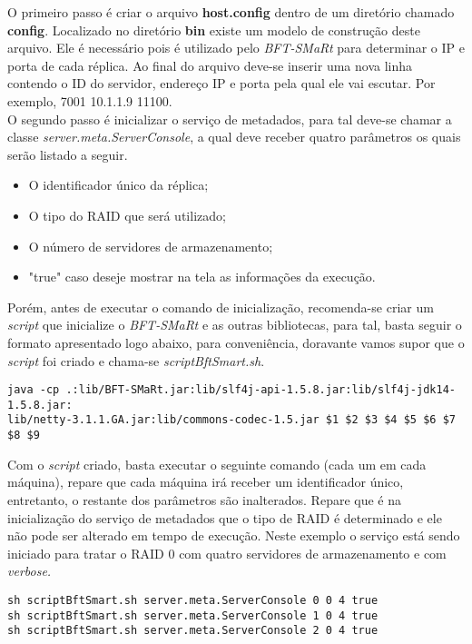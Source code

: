 O primeiro passo é criar o arquivo \textbf{host.config} dentro de um diretório chamado \textbf{config}. Localizado no diretório \textbf{bin} existe um modelo de construção deste arquivo. Ele é necessário pois é utilizado pelo \textit{BFT-SMaRt} para determinar o IP e porta de cada réplica. Ao final do arquivo deve-se inserir uma nova linha contendo o ID do servidor, endereço IP e porta pela qual ele vai escutar. Por exemplo, 7001 10.1.1.9 11100.
\\

O segundo passo é inicializar o serviço de metadados, para tal deve-se chamar a classe \textit{server.meta.ServerConsole}, a qual deve receber quatro parâmetros os quais serão listado a seguir. 

\begin{itemize}
	\item O identificador único da réplica;
	\item O tipo do RAID que será utilizado;
	\item O número de servidores de armazenamento;
	\item "true" caso deseje mostrar na tela as informações da execução.
\end{itemize}

Porém, antes de executar o comando de inicialização, recomenda-se criar um \textit{script} que inicialize o \textit{BFT-SMaRt} e as outras bibliotecas, para tal, basta seguir o formato apresentado logo abaixo, para conveniência, doravante vamos supor que o \textit{script} foi criado e chama-se \textit{scriptBftSmart.sh}.

\begin{lstlisting}
java -cp .:lib/BFT-SMaRt.jar:lib/slf4j-api-1.5.8.jar:lib/slf4j-jdk14-1.5.8.jar:
lib/netty-3.1.1.GA.jar:lib/commons-codec-1.5.jar $1 $2 $3 $4 $5 $6 $7 $8 $9
\end{lstlisting}

Com o \textit{script} criado, basta executar o seguinte comando (cada um em cada máquina), repare que cada máquina irá receber um identificador único, entretanto, o restante dos parâmetros são inalterados. Repare que é na inicialização do serviço de metadados que o tipo de RAID é determinado e ele não pode ser alterado em tempo de execução. Neste exemplo o serviço está sendo iniciado para tratar o RAID 0 com quatro servidores de armazenamento e com \textit{verbose.}
\\

\begin{lstlisting}
sh scriptBftSmart.sh server.meta.ServerConsole 0 0 4 true
sh scriptBftSmart.sh server.meta.ServerConsole 1 0 4 true
sh scriptBftSmart.sh server.meta.ServerConsole 2 0 4 true
\end{lstlisting}

